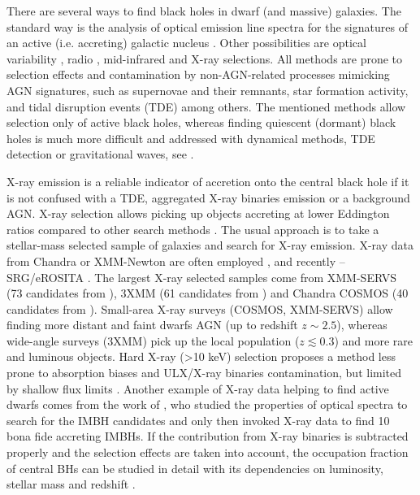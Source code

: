 \documentclass[fleqn,usenatbib]{mnras}
\begin{document}
There are several ways to find black holes in dwarf (and massive) galaxies. The standard way is the analysis of optical emission line spectra for the signatures of an active (i.e. accreting) galactic nucleus \citep{Reines2013, Chilingarian2018, Molina2021}. Other possibilities are optical variability \citep{Baldassare2020, Ward2022}, radio \citep{Reines2011, Reines2020}, mid-infrared  \citep{Sartori2015, Marleau2017} and X-ray \citep{Birchall2022, Zou2023} selections. All methods are prone to selection effects and contamination by non-AGN-related processes mimicking AGN signatures, such as supernovae and their remnants, star formation activity, and tidal disruption events (TDE) among others. The mentioned methods allow selection only of active black holes, whereas finding quiescent (dormant) black holes is much more difficult and addressed with dynamical methods, TDE detection or gravitational waves, see  \citet{Reines2022}. 

X-ray emission is a reliable indicator of accretion onto the central black hole if it is not confused with a TDE, aggregated X-ray binaries emission or a background AGN. X-ray selection allows picking up objects accreting at lower Eddington ratios compared to other search methods \citep{Birchall2022}.  The usual approach is to take a stellar-mass selected sample of galaxies and search for X-ray emission. X-ray data from Chandra or XMM-Newton are often employed \citep{Pardo2016, Lemons2015, Baldassare2017,  Birchall2020, Mezcua2023}, and recently -- SRG/eROSITA \citep{Latimer2021}. The largest X-ray selected samples come from XMM-SERVS (73 candidates from \citealt{Zou2023}), 3XMM (61 candidates from \citealt{Birchall2020}) and Chandra COSMOS (40 candidates from \citealt{Mezcua2018}). Small-area X-ray surveys (COSMOS, XMM-SERVS) allow finding more distant and faint dwarfs AGN (up to redshift $z\sim2.5$), whereas wide-angle surveys (3XMM) pick up the local population ($z\lesssim0.3$) and more rare and luminous objects. Hard X-ray (>10 keV) selection proposes a method less prone to absorption biases and ULX/X-ray binaries contamination, but limited by shallow flux limits \citep[e.g.][]{Mereminskiy2023}.  Another example of X-ray data helping to find active dwarfs comes from the work of \citet{Chilingarian2018}, who studied the properties of optical spectra to search for the IMBH candidates and only then invoked X-ray data to find 10 bona fide accreting IMBHs.  If the contribution from X-ray binaries is subtracted properly and the selection effects are taken into account, the occupation fraction of central BHs can be studied in detail with its dependencies on luminosity, stellar mass and redshift \citep{Mezcua2018, Birchall2020, Zou2023}.   
\end{document}
